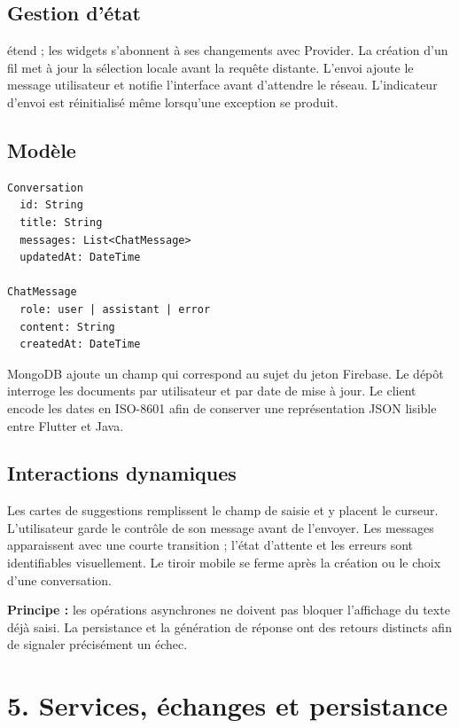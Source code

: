 \documentclass[10pt,a4paper]{article}
\newcommand{\callout}[1]{%
  \par\smallskip\noindent
  \colorbox{paper}{\parbox{\dimexpr\linewidth-2\fboxsep\relax}{#1}}%
  \par\smallskip
}
\newcommand{\file}[1]{\texttt{\detokenize{#1}}}
\begin{document}
\subsection*{Gestion d'état}
\file{AppState} étend \file{ChangeNotifier}; les widgets s'abonnent à ses changements avec Provider. La création d'un fil met à jour la sélection locale avant la requête distante. L'envoi ajoute le message utilisateur et notifie l'interface avant d'attendre le réseau. L'indicateur d'envoi est réinitialisé même lorsqu'une exception se produit.

\subsection*{Modèle}
\begin{lstlisting}
Conversation
  id: String
  title: String
  messages: List<ChatMessage>
  updatedAt: DateTime

ChatMessage
  role: user | assistant | error
  content: String
  createdAt: DateTime
\end{lstlisting}

MongoDB ajoute un champ \file{userId} qui correspond au sujet du jeton Firebase. Le dépôt interroge les documents par utilisateur et par date de mise à jour. Le client encode les dates en ISO-8601 afin de conserver une représentation JSON lisible entre Flutter et Java.

\subsection*{Interactions dynamiques}
Les cartes de suggestions remplissent le champ de saisie et y placent le curseur. L'utilisateur garde le contrôle de son message avant de l'envoyer. Les messages apparaissent avec une courte transition ; l'état d'attente et les erreurs sont identifiables visuellement. Le tiroir mobile se ferme après la création ou le choix d'une conversation.

\callout{\textbf{Principe :} les opérations asynchrones ne doivent pas bloquer l'affichage du texte déjà saisi. La persistance et la génération de réponse ont des retours distincts afin de signaler précisément un échec.}

\newpage
\section*{5. Services, échanges et persistance}
\end{document}
